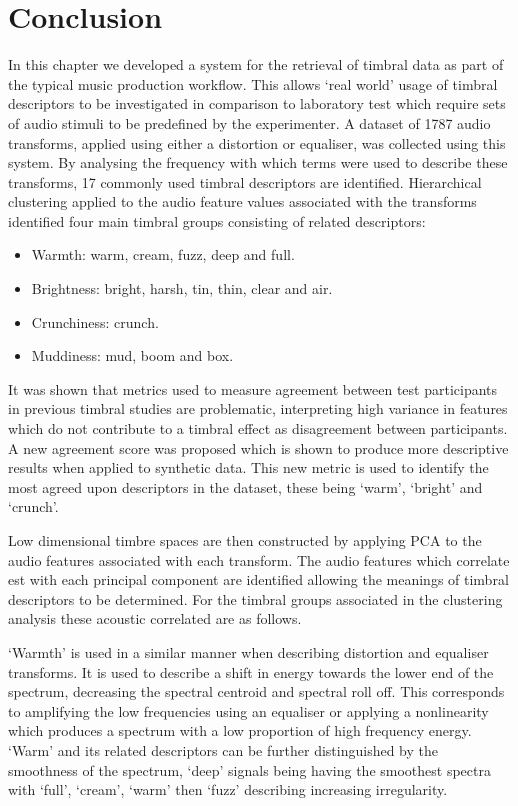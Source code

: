 \section{Conclusion}
	In this chapter we developed a system for the retrieval of timbral data as part of the typical music production
	workflow. This allows `real world' usage of timbral descriptors to be investigated in comparison to laboratory test
	which require sets of audio stimuli to be predefined by the experimenter. A dataset of 1787 audio transforms,
	applied using either a distortion or equaliser, was collected using this system. By analysing the frequency with
	which terms were used to describe these transforms, 17 commonly used timbral descriptors are identified.
	Hierarchical clustering applied to the audio feature values associated with the transforms identified four main
	timbral groups consisting of related descriptors:

	\begin{itemize}
		\item Warmth: warm, cream, fuzz, deep and full.
		\item Brightness: bright, harsh, tin, thin, clear and air.
		\item Crunchiness: crunch.
		\item Muddiness: mud, boom and box.
	\end{itemize}

	It was shown that metrics used to measure agreement between test participants in previous timbral studies are
	problematic, interpreting high variance in features which do not contribute to a timbral effect as disagreement
	between participants. A new agreement score was proposed which is shown to produce more descriptive results when
	applied to synthetic data. This new metric is used to identify the most agreed upon descriptors in the dataset,
	these being `warm', `bright' and `crunch'.

	Low dimensional timbre spaces are then constructed by applying PCA to the audio features associated with each
	transform. The audio features which correlate est with each principal component are identified allowing the
	meanings of timbral descriptors to be determined. For the timbral groups associated in the clustering analysis
	these acoustic correlated are as follows.

	`Warmth' is used in a similar manner when describing distortion and equaliser transforms. It is used to describe a
	shift in energy towards the lower end of the spectrum, decreasing the spectral centroid and spectral roll off. This
	corresponds to amplifying the low frequencies using an equaliser or applying a nonlinearity which produces a
	spectrum with a low proportion of high frequency energy. `Warm' and its related descriptors can be further
	distinguished by the smoothness of the spectrum, `deep' signals being having the smoothest spectra with `full',
	`cream', `warm' then `fuzz' describing increasing irregularity.

